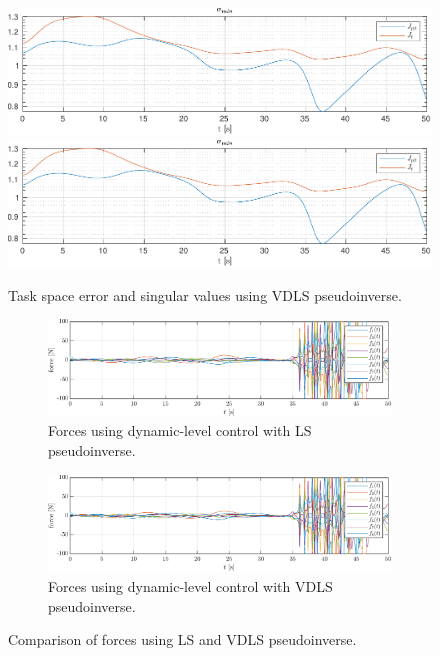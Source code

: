 \begin{figure}[h!]
    \centering
    \includegraphics[page=1,width=\linewidth]{assets/results/VDLSI.pdf}
    \includegraphics[page=2,width=\linewidth]{assets/results/VDLSI.pdf}
    \caption{Task space error and singular values using VDLS pseudoinverse.}
    \label{fig:vdls}
\end{figure}

\begin{figure}[h!]
    \centering
    \begin{subfigure}[b]{\linewidth}
        \includegraphics[page=1,width=\linewidth]{assets/ls_vdls_force.pdf}
        \caption{Forces using dynamic-level control with LS pseudoinverse.}
    \end{subfigure}
    \begin{subfigure}[b]{\linewidth}
        \includegraphics[page=2,width=\linewidth]{assets/ls_vdls_force.pdf}
        \caption{Forces using dynamic-level control with VDLS pseudoinverse.}
    \end{subfigure}
    \caption{Comparison of forces using LS and VDLS pseudoinverse.}
    \label{fig:ls_vdls_force}
\end{figure}

